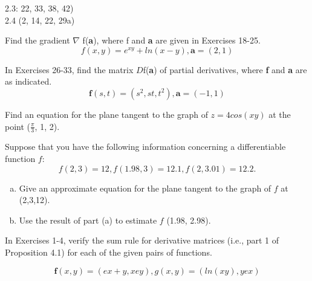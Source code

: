 \documentclass[11pt,letterpaper,boxed]{pset}
\begin{document}
    \begin{center}
        2.3: 22, 33, 38, 42) \\
        2.4 (2, 14, 22, 29a)
    \end{center}
    
    
    \begin{problem}[2.3 \#22]
    Find the gradient $\nabla$ f(\textbf{a}), where f and \textbf{a} are given in Exercises 18-25.
    \[f(x,y)=e^{xy}+ln(x-y), \textbf{a}=(2,1)\]
    \end{problem}
    \newpage
    
    
    \begin{problem}[2.3 \#33]
    In Exercises 26-33, find the matrix $D$f(\textbf{a}) of partial derivatives, where \textbf{f} and \textbf{a} are as indicated.
    \[\textbf{f}(s,t) = (s^2,st,t^2), \textbf{a} = (−1,1)\]
    \end{problem}
    \newpage
    
    
    \begin{problem}[2.3 \#38]
    Find an equation for the plane tangent to the graph of $z = 4 cos(xy)$ at the point ($\frac{\pi}{3}$, 1, 2).
    \end{problem}
    \newpage
    
    
    \begin{problem}[2.3 \#42]
    Suppose that you have the following information concerning a differentiable function $f$:
    \[ f (2,3) = 12, f (1.98,3) = 12.1, f (2,3.01) = 12.2. \]
    
    \begin{enumerate} [(a)]
        \item Give an approximate equation for the plane tangent to the graph of $f$ at (2,3,12).
        \item Use the result of part (a) to estimate $f$ (1.98, 2.98).
    \end{enumerate}
    
    \end{problem}
    \newpage
    
    
    \begin{problem}[2.4 \#2]
    In Exercises 1-4, verify the sum rule for derivative matrices (i.e., part 1 of Proposition 4.1) for each of the given pairs of functions.
    
    \[\textbf{f}(x,y)=(ex+y,xey), g(x,y)=(ln(xy),yex)\]
    
    \end{problem}
    \newpage
    
\end{document}
